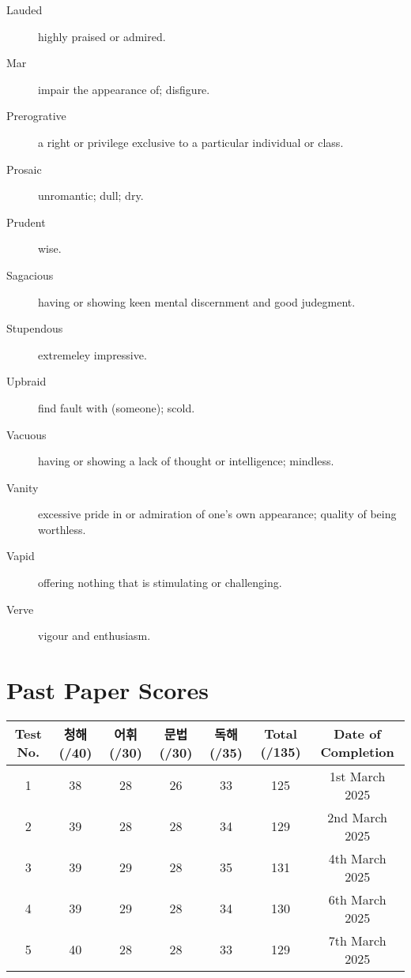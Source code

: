 \documentclass{article}
\begin{document}
\begin{multicols}{2}
\begin{description}
    \item[Lauded] highly praised or admired.
    \item[Mar] impair the appearance of; disfigure.
    \item[Prerogrative] a right or privilege exclusive to a particular individual or class.
    \item[Prosaic] unromantic; dull; dry.
    \item[Prudent] wise.
    \item[Sagacious] having or showing keen mental discernment and good judegment.
    \item[Stupendous] extremeley impressive.
    \item[Upbraid] find fault with (someone); scold.
    \item[Vacuous] having or showing a lack of thought or intelligence; mindless.
    \item[Vanity] excessive pride in or admiration of one's own appearance; quality of being worthless.
    \item[Vapid] offering nothing that is stimulating or challenging.
    \item[Verve] vigour and enthusiasm.
\end{description}
\end{multicols}


\section*{Past Paper Scores}
\begin{tabularx}{\textwidth}{c c c c c c c}
\toprule
\textbf{Test No.} & \textbf{청해 (/40)} & \textbf{어휘 (/30)} & \textbf{문법 (/30)} & \textbf{독해 (/35)} & \textbf{Total (/135)} & \textbf{Date of Completion} \\
\midrule
1 & 38 & 28 & 26 & 33 & 125 & 1st March 2025 \\
2 & 39 & 28 & 28 & 34 & 129 & 2nd March 2025 \\
3 & 39 & 29 & 28 & 35 & 131 & 4th March 2025 \\
4 & 39 & 29 & 28 & 34 & 130 & 6th March 2025 \\
5 & 40 & 28 & 28 & 33 & 129 & 7th March 2025 \\
\bottomrule
\end{tabularx}
\end{document}
